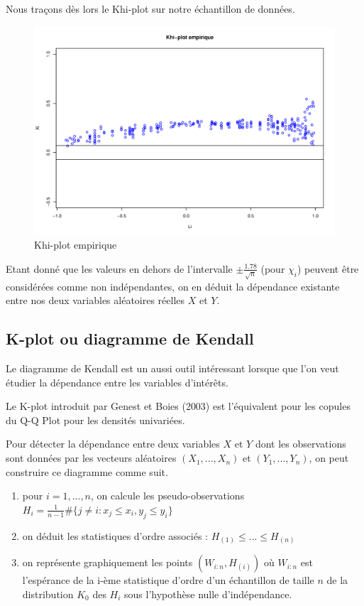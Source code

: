 Nous traçons dès lors le Khi-plot sur notre échantillon de données.

\noindent%
\begin{figure}[H]
    \begin{center}
      \includegraphics[width=14 cm, angle=0]{./pictures/chi_plot_empir.png}
      \centering\caption{Khi-plot empirique}
    \end{center}
\end{figure}

Etant donné que les valeurs en dehors de l'intervalle $\pm \frac{1.78}{\sqrt{n}}$ (pour $\chi_i$) peuvent être considérées comme non indépendantes, on en déduit
la dépendance existante entre nos deux variables aléatoires réelles $X$ et $Y$. 

\subsection{K-plot ou diagramme de Kendall}

Le diagramme de Kendall est un aussi outil intéressant lorsque que l'on veut étudier la dépendance entre les variables d'intérêts.

Le K-plot introduit par Genest et Boies (2003) est l'équivalent pour les copules du Q-Q Plot pour les
densités univariées.

Pour détecter la dépendance entre deux variables $X$ et $Y$ dont les observations sont données par les vecteurs aléatoires $(X_1,...,X_n)$ et
$(Y_1,...,Y_n)$, on peut construire ce diagramme comme suit.

\begin{enumerate}
\item pour $i=1,...,n$, on calcule les pseudo-observations $H_i = \frac{1}{n-1} \# \{j \neq i : x_j \leq x_i, y_j \leq y_i \}$
\item on déduit les statistiques d'ordre associés : $H_{(1)} \leq ... \leq H_{(n)}$
\item on représente graphiquement les points $(W_{i:n},H_{(i)})$ où $W_{i:n}$ est l'espérance de la i-ème statistique d'ordre 
d'un échantillon de taille $n$ de la distribution $K_0$ des $H_i$ sous l'hypothèse nulle d'indépendance.
\end{enumerate}

